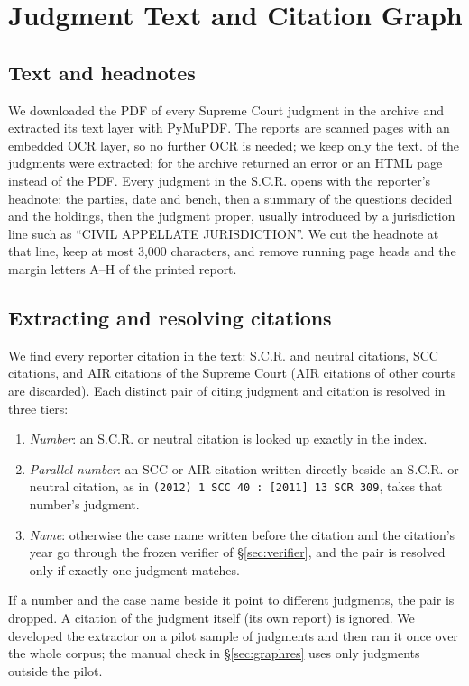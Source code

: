 \section{Judgment Text and Citation Graph}
\label{sec:graph}
\subsection{Text and headnotes}
We downloaded the PDF of every Supreme Court judgment in the archive and extracted its text layer with PyMuPDF. The reports are scanned pages with an embedded OCR layer, so no further OCR is needed; we keep only the text. \GraphTextOK{} of the \CorpusSC{} judgments were extracted; for \GraphTextFail{} the archive returned an error or an HTML page instead of the PDF. Every judgment in the S.C.R. opens with the reporter's headnote: the parties, date and bench, then a summary of the questions decided and the holdings, then the judgment proper, usually introduced by a jurisdiction line such as ``CIVIL APPELLATE JURISDICTION''. We cut the headnote at that line, keep at most 3{,}000 characters, and remove running page heads and the margin letters A--H of the printed report.

\subsection{Extracting and resolving citations}
We find every reporter citation in the text: S.C.R. and neutral citations, SCC citations, and AIR citations of the Supreme Court (AIR citations of other courts are discarded). Each distinct pair of citing judgment and citation is resolved in three tiers:
\begin{enumerate}
\item \emph{Number}: an S.C.R. or neutral citation is looked up exactly in the index.
\item \emph{Parallel number}: an SCC or AIR citation written directly beside an S.C.R. or neutral citation, as in \texttt{(2012) 1 SCC 40 : [2011] 13 SCR 309}, takes that number's judgment.
\item \emph{Name}: otherwise the case name written before the citation and the citation's year go through the frozen verifier of \S\ref{sec:verifier}, and the pair is resolved only if exactly one judgment matches.
\end{enumerate}
If a number and the case name beside it point to different judgments, the pair is dropped. A citation of the judgment itself (its own report) is ignored. We developed the extractor on a pilot sample of \PilotN{} judgments and then ran it once over the whole corpus; the manual check in \S\ref{sec:graphres} uses only judgments outside the pilot.
